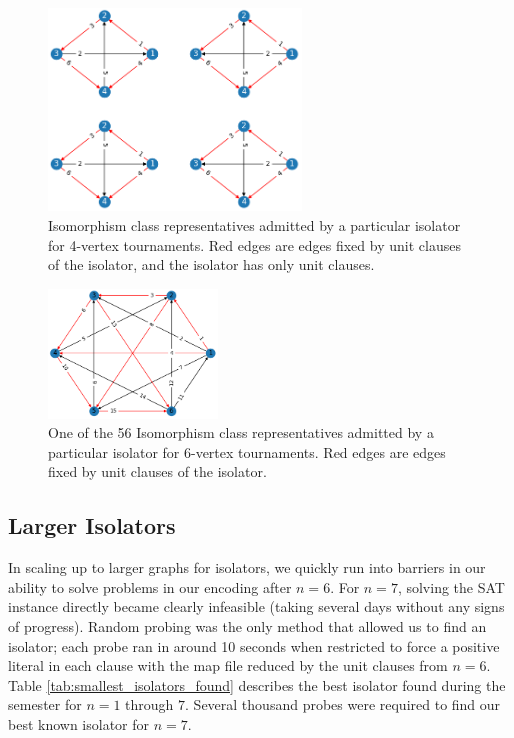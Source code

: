 \documentclass[a4paper,UKenglish,cleveref, autoref, thm-restate]{lipics-v2021}
\begin{document}
\begin{figure}
\includegraphics[width=0.6\textwidth]{iso_4.png}
\caption{Isomorphism class representatives admitted by a particular isolator for 4-vertex tournaments. Red edges are edges fixed by unit clauses of the isolator, and the isolator has only unit clauses.} \label{fig1}
\end{figure}

\begin{figure}
\includegraphics[width=0.4\textwidth]{iso6.png}
\caption{One of the 56 Isomorphism class representatives admitted by a particular isolator for 6-vertex tournaments. Red edges are edges fixed by unit clauses of the isolator.} \label{fig3}
\end{figure}

\subsection{Larger Isolators}

In scaling up to larger graphs for isolators, we quickly run into barriers in our ability to solve problems in our encoding after $n = 6$.  For $n = 7$, solving the SAT instance directly became clearly infeasible (taking several days without any signs of progress). Random probing was the only method that allowed us to find an isolator; each probe ran in around 10 seconds when restricted to force a positive literal in each clause with the map file reduced by the unit clauses from $n=6$.  Table \ref{tab:smallest_isolators_found} describes the best isolator found during the semester for $n = 1$ through $7$. Several thousand probes were required to find our best known isolator for $n=7$.
\end{document}
